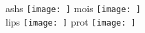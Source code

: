 
\begin{figure}[H]
\centering
	\subcaptionbox%
	{ashs\label{subfig:}}%
		{\texttt{[image: ]}}%
\hfill
	\subcaptionbox%
	{mois\label{subfig:}}%
		{\texttt{[image: ]}}%
\\[\vbtwsfig]
	\subcaptionbox%
	{lips\label{subfig:}}%
		{\texttt{[image: ]}}%
\hfill
	\subcaptionbox%
	{prot\label{subfig:}}%
		{\texttt{[image: ]}}%
\caption%
{}
\label{fig:}
\end{figure}
